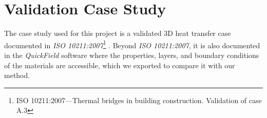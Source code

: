 \section{Validation Case Study}
The case study used for this project is a validated 3D heat transfer case documented in \textit{ISO 10211:2007}\footnote{ISO 10211:2007---Thermal bridges in building construction. Validation of case A.3} \cite{ISO}. 
Beyond \textit{ISO 10211:2007}, it is also documented in the \textit{QuickField} software where the properties, layers, and boundary conditions of the materials are accessible, which we exported to compare it with our method. 

   


